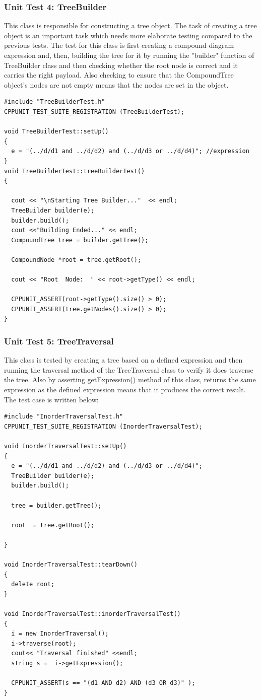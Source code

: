 \documentclass[10pt, a4paper, titlepage]{article}
\begin{document}
\subsubsection{Unit Test 4: TreeBuilder}
This class is responsible for constructing a tree object. The task of creating a tree object is an important task which needs more elaborate testing compared to the previous tests. The test for this class is first creating a compound diagram expression and, then, building the tree for it by running the "builder" function of TreeBuilder class and then checking whether the root node is correct and it carries the right payload. Also checking to ensure that the CompoundTree object's nodes are not empty means that the nodes are set in the object.
\small
\begin{lstlisting}
#include "TreeBuilderTest.h"
CPPUNIT_TEST_SUITE_REGISTRATION (TreeBuilderTest);

void TreeBuilderTest::setUp()
{
  e = "(../d/d1 and ../d/d2) and (../d/d3 or ../d/d4)"; //expression
}
void TreeBuilderTest::treeBuilderTest()
{

  cout << "\nStarting Tree Builder..."  << endl;
  TreeBuilder builder(e);
  builder.build();
  cout <<"Building Ended..." << endl;
  CompoundTree tree = builder.getTree();

  CompoundNode *root = tree.getRoot();

  cout << "Root  Node:  " << root->getType() << endl;
  
  CPPUNIT_ASSERT(root->getType().size() > 0);
  CPPUNIT_ASSERT(tree.getNodes().size() > 0);
}
\end{lstlisting}
\large

\subsubsection{Unit Test 5: TreeTraversal}
This class is tested by creating a tree based on a defined expression and then running the traversal method of the TreeTraversal class to verify it does traverse the tree. Also by asserting getExpression() method of this class, returns the same expression as the defined expression means that it produces the correct result. The test case is written below:  
\small
\begin{lstlisting}
#include "InorderTraversalTest.h"
CPPUNIT_TEST_SUITE_REGISTRATION (InorderTraversalTest);

void InorderTraversalTest::setUp()
{
  e = "(../d/d1 and ../d/d2) and (../d/d3 or ../d/d4)";
  TreeBuilder builder(e);
  builder.build();
  
  tree = builder.getTree();

  root  = tree.getRoot();
  
}

void InorderTraversalTest::tearDown()
{
  delete root;
}

void InorderTraversalTest::inorderTraversalTest()
{
  i = new InorderTraversal();
  i->traverse(root);
  cout<< "Traversal finished" <<endl;
  string s =  i->getExpression();
  
  CPPUNIT_ASSERT(s == "(d1 AND d2) AND (d3 OR d3)" );
}
\end{lstlisting}
\large
\end{document}
